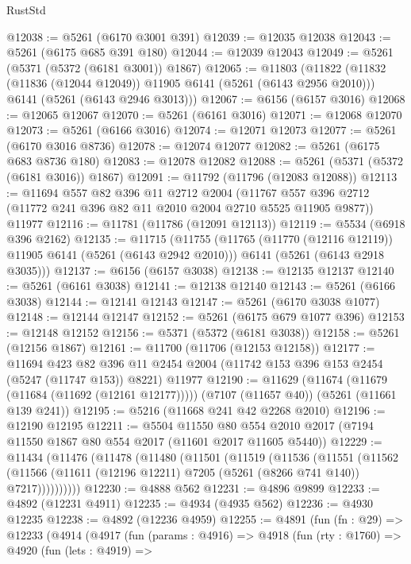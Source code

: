 \begin{lexlean}{RustStd}
\begin{coremodule}
@12038 := @5261 (@6170 @3001 @391)
@12039 := @12035 @12038
@12043 := @5261 (@6175 @685 @391 @180)
@12044 := @12039 @12043
@12049 := @5261 (@5371 (@5372 (@6181 @3001)) @1867)
@12065 := @11803
    (@11822
      (@11832 (@11836 (@12044 @12049)) @11905 @6141 (@5261 (@6143 @2956 @2010)))
      @6141
      (@5261 (@6143 @2946 @3013)))
@12067 := @6156 (@6157 @3016)
@12068 := @12065 @12067
@12070 := @5261 (@6161 @3016)
@12071 := @12068 @12070
@12073 := @5261 (@6166 @3016)
@12074 := @12071 @12073
@12077 := @5261 (@6170 @3016 @8736)
@12078 := @12074 @12077
@12082 := @5261 (@6175 @683 @8736 @180)
@12083 := @12078 @12082
@12088 := @5261 (@5371 (@5372 (@6181 @3016)) @1867)
@12091 := @11792 (@11796 (@12083 @12088))
@12113 := @11694
    @557
    @82
    @396
    @11
    @2712
    @2004
    (@11767 @557 @396 @2712 (@11772 @241 @396 @82 @11 @2010 @2004 @2710 @5525 @11905 @9877))
    @11977
@12116 := @11781 (@11786 (@12091 @12113))
@12119 := @5534 (@6918 @396 @2162)
@12135 := @11715
    (@11755
      (@11765 (@11770 (@12116 @12119)) @11905 @6141 (@5261 (@6143 @2942 @2010)))
      @6141
      (@5261 (@6143 @2918 @3035)))
@12137 := @6156 (@6157 @3038)
@12138 := @12135 @12137
@12140 := @5261 (@6161 @3038)
@12141 := @12138 @12140
@12143 := @5261 (@6166 @3038)
@12144 := @12141 @12143
@12147 := @5261 (@6170 @3038 @1077)
@12148 := @12144 @12147
@12152 := @5261 (@6175 @679 @1077 @396)
@12153 := @12148 @12152
@12156 := @5371 (@5372 (@6181 @3038))
@12158 := @5261 (@12156 @1867)
@12161 := @11700 (@11706 (@12153 @12158))
@12177 := @11694
    @423
    @82
    @396
    @11
    @2454
    @2004
    (@11742 @153 @396 @153 @2454 (@5247 (@11747 @153)) @8221)
    @11977
@12190 := @11629
    (@11674 (@11679 (@11684 (@11692 (@12161 @12177)))))
    (@7107 (@11657 @40))
    (@5261 (@11661 @139 @241))
@12195 := @5216 (@11668 @241 @42 @2268 @2010)
@12196 := @12190 @12195
@12211 := @5504
    @11550
    @80
    @554
    @2010
    @2017
    (@7194 @11550 @1867 @80 @554 @2017 (@11601 @2017 @11605 @5440))
@12229 := @11434
    (@11476
      (@11478
        (@11480
          (@11501
            (@11519
              (@11536
                (@11551
                  (@11562
                    (@11566 (@11611 (@12196 @12211) @7205 (@5261 (@8266 @741 @140)) @7217))))))))))
@12230 := @4888 @562
@12231 := @4896 @9899
@12233 := @4892 (@12231 @4911)
@12235 := @4934 (@4935 @562)
@12236 := @4930 @12235
@12238 := @4892 (@12236 @4959)
@12255 := @4891
    (fun (fn : @29) =>
    @12233
      (@4914
        (@4917
          (fun (params : @4916) =>
          @4918
            (fun (rty : @1760) =>
            @4920
              (fun (lets : @4919) =>

\end{coremodule}
\end{lexlean}
